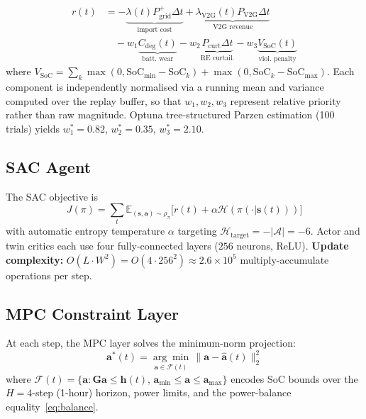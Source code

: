 \documentclass[journal,10pt,twocolumn]{IEEEtran}
\begin{document}
\begin{align}
r(t)&=-\underbrace{\lambda(t)P_\mathrm{grid}^+\Delta t}_{\text{import cost}}
     +\underbrace{\lambda_\mathrm{V2G}(t)P_\mathrm{V2G}\Delta t}_{\text{V2G revenue}}
     \nonumber\\[2pt]
    &\quad-w_1\underbrace{C_\mathrm{deg}(t)}_{\text{batt.\ wear}}
     -w_2\underbrace{P_\mathrm{curt}\Delta t}_{\text{RE curtail.}}
     -w_3\underbrace{V_\mathrm{SoC}(t)}_{\text{viol.\ penalty}}
\label{eq:reward}
\end{align}
where $V_\mathrm{SoC}=\sum_k\max(0,\mathrm{SoC}_\mathrm{min}-\mathrm{SoC}_k)
+\max(0,\mathrm{SoC}_k-\mathrm{SoC}_\mathrm{max})$.
Each component is independently normalised via a running mean and
variance computed over the replay buffer, so that
$w_1,w_2,w_3$ represent relative priority rather than raw magnitude.
Optuna tree-structured Parzen estimation (100 trials) yields
$w_1^*=0.82$, $w_2^*=0.35$, $w_3^*=2.10$.

\subsection{SAC Agent}

The SAC objective is
\begin{equation}
J(\pi)=\textstyle\sum_t\mathbb{E}_{(\mathbf{s},\mathbf{a})\sim\rho_\pi}
    \bigl[r(t)+\alpha\mathcal{H}(\pi(\cdot|\mathbf{s}(t)))\bigr]
\label{eq:sac}
\end{equation}
with automatic entropy temperature $\alpha$ targeting
$\mathcal{H}_\mathrm{target}=-|\mathcal{A}|=-6$.
Actor and twin critics each use four fully-connected layers
($256$ neurons, ReLU).
\textbf{Update complexity:} $O(L\cdot W^2)=O(4\cdot256^2)
\approx2.6\times10^5$ multiply-accumulate operations per step.

\subsection{MPC Constraint Layer}

At each step, the MPC layer solves the minimum-norm projection:
\begin{equation}
\mathbf{a}^*(t)=\underset{\mathbf{a}\in\mathcal{F}(t)}{\arg\min}\,
    \|\mathbf{a}-\hat{\mathbf{a}}(t)\|_2^2
\label{eq:mpc}
\end{equation}
where $\mathcal{F}(t)=\{\mathbf{a}:\mathbf{G}\mathbf{a}
\leq\mathbf{h}(t),\,\mathbf{a}_\mathrm{min}\leq\mathbf{a}
\leq\mathbf{a}_\mathrm{max}\}$ encodes SoC bounds over the
$H=4$-step (1-hour) horizon, power limits, and the power-balance
equality~\eqref{eq:balance}.
\end{document}
